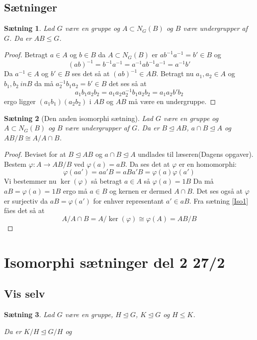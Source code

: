 \documentclass{article}
\newcommand{\inv}{^{-1}}
\newcommand{\too}{\rightarrow}
\newtheorem{setn}{Sætning}
\begin{document}
{		\subsection*{Sætninger}
		\begin{setn}
			Lad $G$ være en gruppe og $A \subset N_G(B)$ og $B$ være undergrupper af $G$.
			Da er $AB \le G$.
		\end{setn}
		\begin{proof}
			Betragt $a \in A$ og $b \in B$ da $A \subset N_G(B)$ er $ab\inv a\inv = b' \in B$ og
			$$(ab)\inv = b\inv a\inv = a\inv a b \inv a \inv = a \inv b'$$
			Da $a\inv \in A$ og $b' \in B$ ses det så at $(ab)\inv \in AB$. Betragt nu
			$a_1, a_2 \in A$ og $b_1, b_2 \ in B$ da må $a_2\inv b_1 a_2 = b' \in B$ det ses så at
			$$a_1b_1a_2b_2 = a_1a_2a_2\inv b_1a_2b_2 = a_1a_2b'b_2$$
			ergo ligger $(a_1b_1)(a_2b_2)$ i $AB$ og $AB$ må være en undergruppe.
		\end{proof}
		\begin{setn}[Den anden isomorphi sætning]
			Lad $G$ være en gruppe og $A \subset N_G(B)$ og $B$ være undergrupper af $G$.
			Da er $B \unlhd AB$, $a\cap B \unlhd A$ og $AB/B \cong A/A\cap B$.
		\end{setn}
		\begin{proof}
			Beviset for at $B \unlhd AB$ og $a\cap B \unlhd A$ undlades til læseren(Dagens opgaver).
			Bestem $\varphi: A \too AB/B$ ved $\varphi(a) = aB$. Da ses det at $\varphi$ er en
			homomorphi:
			$$\varphi(aa') = aa'B = aBa'B = \varphi(a)\varphi(a')$$
			Vi bestemmer nu $\ker(\varphi)$ så betragt $a \in A$ så $\varphi(a) = 1B$
			Da må $aB = \varphi(a) = 1B$ ergo må $a \in B$ og kernen er dermed $A\cap B$.
			Det ses også at $\varphi$ er surjectiv da $aB = \varphi(a')$ for enhver representant
			$a' \in aB$. Fra sætning \ref{Iso1} fåes det så at
			$$A/A\cap B = A/\ker(\varphi) \cong \varphi(A) = AB/B$$
		\end{proof}
	\newpage
	\section*{Isomorphi sætninger del 2 27/2}
		\subsection*{Vis selv}
		\begin{setn}
			Lad $G$ være en gruppe, $H \unlhd G$, $K \unlhd G$ og $H \le K$.

			Da er $K/H \unlhd G/H$ og
		\end{setn}
}
\end{document}
